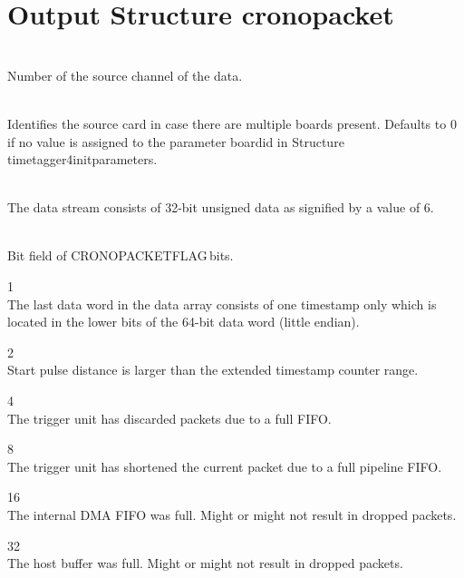 


\section{Output Structure crono\tu packet}

	\\
	Number of the source channel of the data.\par

	\\
	Identifies the source card in case there are multiple boards present. 
	Defaults to 0 if no value is assigned to the parameter \textsf{board\tu id} in Structure \textsf{timetagger4\tu init\tu parameters}.\par

	\\
	The data stream consists of 32-bit unsigned data as signified by a value of 6.\par

	\\
    Bit field of \textsf{CRONO\tu PACKET\tu FLAG\tu*}\,bits.\par
	\indent{} 1\\
	  \indent The last data word in the data array consists of one timestamp only which is located in the lower  bits of the 64-bit data word (little endian).\par
	\indent{} 2\\
	  \indent Start pulse distance is larger than the extended timestamp counter range.\par
	\indent{} 4\\
	\indent The trigger unit has discarded packets due to a full FIFO.\par
	\indent{} 8\\
	\indent The trigger unit has shortened the current packet due to a full pipeline FIFO.\par
	\indent{} 16\\
	\indent The internal DMA FIFO was full. Might or might not result in dropped packets.\par
	\indent{} 32\\
	\indent The host buffer was full. Might or might not result in dropped packets.\par

